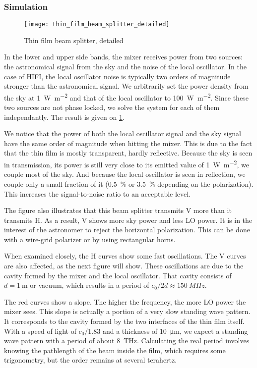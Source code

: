 \subsubsection{Simulation}
\begin{figure}[hbtp]
    \centering
    \texttt{[image: thin\_film\_beam\_splitter\_detailed]}
    \caption{Thin film beam splitter, detailed}
    \label{fig:thin_film_beam_splitter_detailed}
\end{figure}
In the lower and upper side bands, the mixer receives power from two sources: the astronomical signal from the sky and the noise of the local oscillator.
In the case of HIFI, the local oscillator noise is typically two orders of magnitude stronger than the astronomical signal.
We arbitrarily set the power density from the sky at \SI{1}{\watt\per\meter\squared} and that of the local oscillator to \SI{100}{\watt\per\meter\squared}.
Since these two sources are not phase locked, we solve the system for each of them independantly.
The result is given on \cref{fig:thin_film_beam_splitter_detailed}.

We notice that the power of both the local oscillator signal and the sky signal have the same order of magnitude when hitting the mixer.
This is due to the fact that the thin film is mostly transparent, hardly reflective.
Because the sky is seen in transmission, its power is still very close to its emitted value of \SI{1}{\watt\per\meter\squared}, we couple most of the sky.
And because the local oscillator is seen in reflection, we couple only a small fraction of it (\SI{0.5}{\percent} or \SI{3.5}{\percent} depending on the polarization).
This increases the signal-to-noise ratio to an acceptable level.

The figure also illustrates that this beam splitter transmits V more than it transmits H.
As a result, V shows more sky power and less LO power.
It is in the interest of the astronomer to reject the horizontal polarization.
This can be done with a wire-grid polarizer or by using rectangular horns.

When examined closely, the H curves show some fast oscillations.
The V curves are also affected, as the next figure will show.
These oscillations are due to the cavity formed by the mixer and the local oscillator.
That cavity consists of $d=\SI{1}{\meter}$ or vacuum, which results in a period of $c_0 / 2d \approx \SI{150}{MHz}$.

The red curves show a slope.
The higher the frequency, the more LO power the mixer sees.
This slope is actually a portion of a very slow standing wave pattern.
It corresponds to the cavity formed by the two interfaces of the thin film itself.
With a speed of light of $c_0 / 1.83$ and a thickness of \SI{10}{\micro\meter}, we expect a standing wave pattern with a period of about \SI{8}{\tera\hertz}.
Calculating the real period involves knowing the pathlength of the beam inside the film, which requires some trigonometry, but the order remains at several terahertz.

